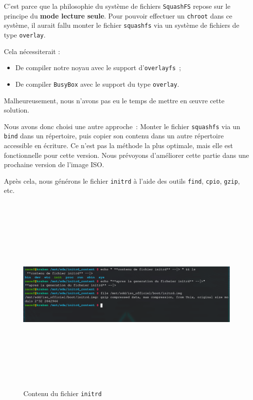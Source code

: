 C’est parce que la philosophie du système de fichiers \texttt{SquashFS} repose sur le principe du \textbf{mode lecture seule}.  
Pour pouvoir effectuer un \texttt{chroot} dans ce système, il aurait fallu monter le fichier \texttt{squashfs} via un système de fichiers de type \texttt{overlay}.

Cela nécessiterait :
\begin{itemize}
  \item De compiler notre noyau avec le support d’\texttt{overlayfs} ;
  \item De compiler \texttt{BusyBox} avec le support du type \texttt{overlay}.
\end{itemize}

Malheureusement, nous n’avons pas eu le temps de mettre en œuvre cette solution.

Nous avons donc choisi une autre approche :  
Monter le fichier \texttt{squashfs} via un \texttt{bind} dans un répertoire, puis copier son contenu dans un autre répertoire accessible en écriture.  
Ce n’est pas la méthode la plus optimale, mais elle est fonctionnelle pour cette version.  
Nous prévoyons d’améliorer cette partie dans une prochaine version de l’image ISO.

\vspace{0.5cm}
\noindent
Après cela, nous générons le fichier \texttt{initrd} à l’aide des outils \texttt{find}, \texttt{cpio}, \texttt{gzip}, etc.

\begin{figure}[H]
  \centering
  \includegraphics[width=1\textwidth, height=10cm]{images_pfe/initrdcontentfile.png}
  \caption{Contenu du fichier \texttt{initrd}}
  \label{fig:initcontent}
\end{figure}

